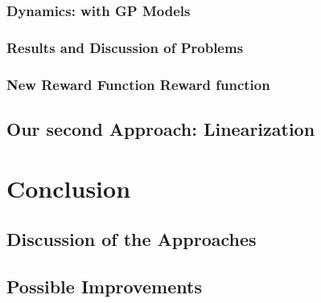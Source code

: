 \subsection{Dynamics: with GP Models}
\subsection{Results and Discussion of Problems}
\subsection{New Reward Function Reward function}
\section{Our second Approach: Linearization}

\chapter{Conclusion}
\section{Discussion of the Approaches}
\section{Possible Improvements}

\appendix

\nocite{*}
\printbibliography
\listoffigures
\listoftables
\listoflistings


